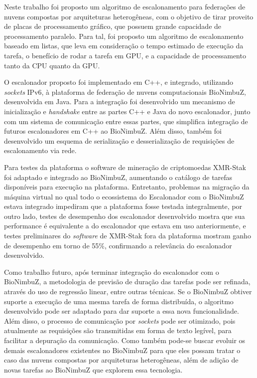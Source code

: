 Neste trabalho foi proposto um algoritmo de escalonamento para federações de nuvens compostas por arquiteturas heterogêneas, com o objetivo de tirar proveito de placas de processamento gráfico, que possuem grande capacidade de processamento paralelo. Para tal, foi proposto um algoritmo de escalonamento baseado em listas, que leva em consideração o tempo estimado de execução da tarefa, o benefício de rodar a tarefa em \acrshort{GPU}, e a capacidade de processamento tanto da \acrshort{CPU} quanto da \acrshort{GPU}.

O escalonador proposto foi implementado em C++, e integrado, utilizando \textit{sockets} \acrshort{IP}v6, à plataforma de federação de nuvens computacionais BioNimbuZ, desenvolvida em Java. Para a integração foi desenvolvido um mecanismo de inicialização e \textit{handshake} entre as partes C++ e Java do novo escalonador, junto com um sistema de comunicação entre essas partes, que simplifica integração de futuros escalonadores em C++ ao BioNimbuZ. Além disso, também foi desenvolvido um esquema de serialização e desserialização de requisições de escalonamento via rede.

Para testes da plataforma o software de mineração de criptomoedas XMR-Stak foi adaptado e integrado ao BioNimbuZ, aumentando o catálogo de tarefas disponíveis para execução na plataforma. Entretanto, problemas na migração da máquina virtual no qual todo o ecossistema do Escalonador com o BioNimbuZ estava integrado impediram que a plataforma fosse testada integralmente, por outro lado, testes de desempenho dos escalonador desenvolvido mostra que sua performance é equivalente a do escalonador que estava em uso anteriormente, e testes preliminares do \textit{software} de XMR-Stak fora da plataforma mostram ganho de desempenho em torno de 55\%, confirmando a relevância do escalonador desenvolvido.


Como trabalho futuro, após terminar integração do escalonador com o BioNimbuZ, a metodologia de previsão de duração das tarefas pode ser refinada, através do uso de regressão linear, entre outras técnicas. Se o BioNimbuZ obtiver suporte a execução de uma mesma tarefa de forma distribuída, o algoritmo desenvolvido pode ser adaptado para dar suporte a essa nova funcionalidade. Além disso, o processo de comunicação por \textit{sockets} pode ser otimizado, pois atualmente as requisições são transmitidas em forma de texto legível, para facilitar a depuração da comunicação. Como também pode-se buscar evoluir os demais escalonadores existentes no BioNimbuZ para que eles possam tratar o caso das nuvens compostas por arquiteturas heterogêneas, além de adição de novas tarefas ao BioNimbuZ que explorem essa tecnologia.

